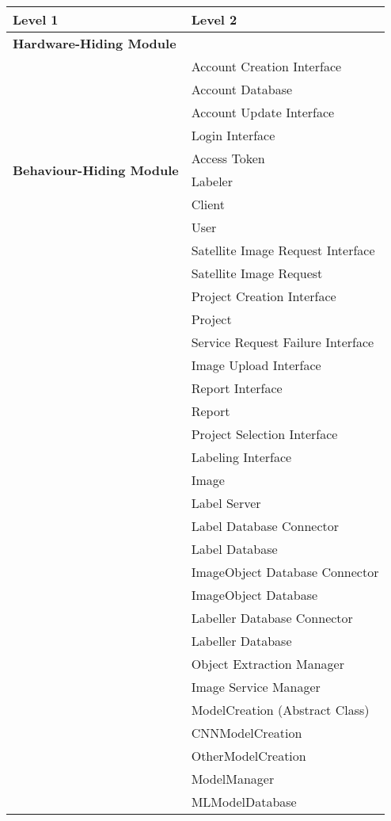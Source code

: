 \documentclass[12pt, titlepage]{article}
\begin{document}
\begin{table}[h!]
  \centering
  \begin{tabular}{p{} p{}}
  \toprule
  \textbf{Level 1} & \textbf{Level 2}\\
  \midrule
  
  \textbf{Hardware-Hiding Module} & ~ \\
  \midrule
  
  \multirow{10}{0.3\textwidth}{\textbf{Behaviour-Hiding Module}} 
   & Account Creation Interface\\
   & Account Database\\
   & Account Update Interface\\
   & Login Interface\\
   & Access Token\\
   & Labeler\\
   & Client\\
   & User\\
   & Satellite Image Request Interface\\
   & Satellite Image Request\\
   & Project Creation Interface\\
   & Project\\
   & Service Request Failure Interface\\
   & Image Upload Interface\\
   & Report Interface\\
   & Report\\
   & Project Selection Interface\\
   & Labeling Interface\\
   & Image\\
   & Label Server\\
   & Label Database Connector\\
   & Label Database\\
   & ImageObject Database Connector\\
   & ImageObject Database\\
   & Labeller Database Connector\\
   & Labeller Database\\
   & Object Extraction Manager\\
   & Image Service Manager\\
   & ModelCreation (Abstract Class)\\
   & CNNModelCreation\\
   & OtherModelCreation\\
   & ModelManager\\
   & MLModelDatabase\\
  \midrule
  

\end{tabular}
\end{table}
\end{document}
